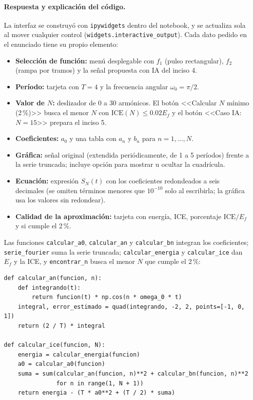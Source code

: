 \documentclass[11pt]{article}
\begin{document}
\paragraph{Respuesta y explicación del código.}
La interfaz se construyó con \texttt{ipywidgets} dentro del notebook, y se actualiza sola al mover cualquier
control (\texttt{widgets.interactive\_output}). Cada dato pedido en el enunciado tiene su propio elemento:
\begin{itemize}[nolistsep]
 \item \textbf{Selección de función:} menú desplegable con $f_1$ (pulso rectangular), $f_2$ (rampa por tramos)
 y la señal propuesta con IA del inciso 4.
 \item \textbf{Período:} tarjeta con $T=4$ y la frecuencia angular $\omega_0=\pi/2$.
 \item \textbf{Valor de $N$:} deslizador de $0$ a $30$ armónicos. El botón <<Calcular $N$ mínimo (2\,\%)>>
 busca el menor $N$ con $\mathrm{ICE}(N)\le0.02E_f$ y el botón <<Caso IA: $N=15$>> prepara el inciso 5.
 \item \textbf{Coeficientes:} $a_0$ y una tabla con $a_n$ y $b_n$ para $n=1,\dots,N$.
 \item \textbf{Gráfica:} señal original (extendida periódicamente, de 1 a 5 períodos) frente a la serie
 truncada; incluye opción para mostrar u ocultar la cuadrícula.
 \item \textbf{Ecuación:} expresión $S_N(t)$ con los coeficientes redondeados a seis decimales
 (se omiten términos menores que $10^{-10}$ solo al escribirla; la gráfica usa los valores sin redondear).
 \item \textbf{Calidad de la aproximación:} tarjeta con energía, ICE, porcentaje $\mathrm{ICE}/E_f$ y si cumple el 2\,\%.
\end{itemize}
Las funciones \texttt{calcular\_a0}, \texttt{calcular\_an} y \texttt{calcular\_bn} integran los coeficientes;
\texttt{serie\_fourier} suma la serie truncada; \texttt{calcular\_energia} y \texttt{calcular\_ice} dan $E_f$ y la ICE,
y \texttt{encontrar\_n} busca el menor $N$ que cumple el 2\,\%:

\begin{lstlisting}
def calcular_an(funcion, n):
    def integrando(t):
        return funcion(t) * np.cos(n * omega_0 * t)
    integral, error_estimado = quad(integrando, -2, 2, points=[-1, 0, 1])
    return (2 / T) * integral

def calcular_ice(funcion, N):
    energia = calcular_energia(funcion)
    a0 = calcular_a0(funcion)
    suma = sum(calcular_an(funcion, n)**2 + calcular_bn(funcion, n)**2
               for n in range(1, N + 1))
    return energia - (T * a0**2 + (T / 2) * suma)
\end{lstlisting}
\end{document}
